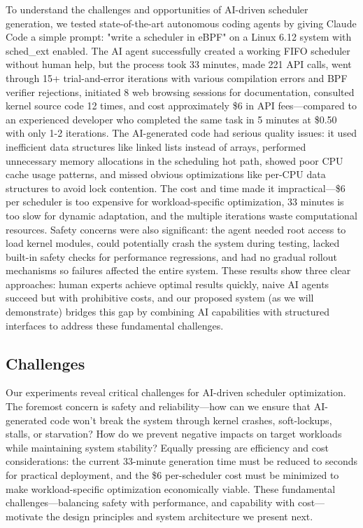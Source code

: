 To understand the challenges and opportunities of AI-driven scheduler generation, we tested state-of-the-art autonomous coding agents by giving Claude Code a simple prompt: "write a scheduler in eBPF" on a Linux 6.12 system with sched\_ext enabled. The AI agent successfully created a working FIFO scheduler without human help, but the process took 33 minutes, made 221 API calls, went through 15+ trial-and-error iterations with various compilation errors and BPF verifier rejections, initiated 8 web browsing sessions for documentation, consulted kernel source code 12 times, and cost approximately \$6 in API fees—compared to an experienced developer who completed the same task in 5 minutes at \$0.50 with only 1-2 iterations. The AI-generated code had serious quality issues: it used inefficient data structures like linked lists instead of arrays, performed unnecessary memory allocations in the scheduling hot path, showed poor CPU cache usage patterns, and missed obvious optimizations like per-CPU data structures to avoid lock contention. The cost and time made it impractical—\$6 per scheduler is too expensive for workload-specific optimization, 33 minutes is too slow for dynamic adaptation, and the multiple iterations waste computational resources. Safety concerns were also significant: the agent needed root access to load kernel modules, could potentially crash the system during testing, lacked built-in safety checks for performance regressions, and had no gradual rollout mechanisms so failures affected the entire system. These results show three clear approaches: human experts achieve optimal results quickly, naive AI agents succeed but with prohibitive costs, and our proposed system (as we will demonstrate) bridges this gap by combining AI capabilities with structured interfaces to address these fundamental challenges.

\subsection{Challenges}

Our experiments reveal critical challenges for AI-driven scheduler optimization. The foremost concern is safety and reliability—how can we ensure that AI-generated code won't break the system through kernel crashes, soft-lockups, stalls, or starvation? How do we prevent negative impacts on target workloads while maintaining system stability? Equally pressing are efficiency and cost considerations: the current 33-minute generation time must be reduced to seconds for practical deployment, and the \$6 per-scheduler cost must be minimized to make workload-specific optimization economically viable. These fundamental challenges—balancing safety with performance, and capability with cost—motivate the design principles and system architecture we present next.